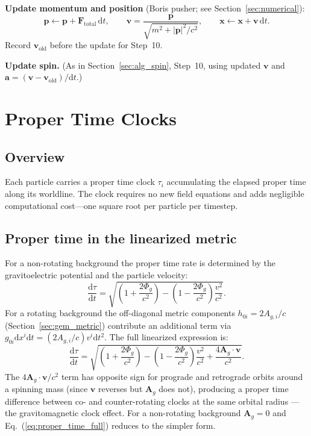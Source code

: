\documentclass[11pt,a4paper]{article}
\newcommand{\vv}[1]{\mathbf{#1}}
\newcommand{\Phig}{\Phi_g}
\newcommand{\Ag}{\vv{A}_g}
\newcommand{\dd}{\mathrm{d}}
\begin{document}
\begin{algsteps}
  \item \textbf{Update momentum and position} (Boris pusher; see Section~\ref{sec:numerical}):
  \begin{equation}
    \vv{p} \leftarrow \vv{p} + \vv{F}_{\mathrm{total}}\,\dd t, \qquad
    \vv{v} = \frac{\vv{p}}{\sqrt{m^2+|\vv{p}|^2/c^2}}, \qquad
    \vv{x} \leftarrow \vv{x} + \vv{v}\,\dd t.
  \end{equation}
  Record $\vv{v}_{\mathrm{old}}$ before the update for Step~10.

  \item \textbf{Update spin.} (As in Section~\ref{sec:alg_spin}, Step~10, using updated $\vv{v}$ and $\vv{a} = (\vv{v}-\vv{v}_{\mathrm{old}})/\dd t$.)
\end{algsteps}

\section{Proper Time Clocks}
\label{sec:proptime}

\subsection{Overview}

Each particle carries a proper time clock $\tau_i$ accumulating the elapsed proper time along its worldline.  The clock requires no new field equations and adds negligible computational cost---one square root per particle per timestep.

\subsection{Proper time in the linearized metric}

For a non-rotating background the proper time rate is determined by the gravitoelectric potential and the particle velocity:
\begin{equation}
  \frac{\dd\tau}{\dd t} = \sqrt{\left(1+\frac{2\Phig}{c^2}\right) - \left(1-\frac{2\Phig}{c^2}\right)\frac{v^2}{c^2}}.
\end{equation}
For a rotating background the off-diagonal metric components $h_{0i} = 2A_{g,i}/c$ (Section~\ref{sec:gem_metric}) contribute an additional term via $g_{0i}\dd x^i\dd t = (2A_{g,i}/c)v^i\dd t^2$.  The full linearized expression is:
\begin{equation}
\label{eq:proper_time_full}
  \frac{\dd\tau}{\dd t} = \sqrt{\left(1+\frac{2\Phig}{c^2}\right) - \left(1-\frac{2\Phig}{c^2}\right)\frac{v^2}{c^2} + \frac{4\Ag\cdot\vv{v}}{c^2}}.
\end{equation}
The $4\Ag\cdot\vv{v}/c^2$ term has opposite sign for prograde and retrograde orbits around a spinning mass (since $\vv{v}$ reverses but $\Ag$ does not), producing a proper time difference between co- and counter-rotating clocks at the same orbital radius --- the gravitomagnetic clock effect.  For a non-rotating background $\Ag = 0$ and Eq.~(\ref{eq:proper_time_full}) reduces to the simpler form.
\end{document}
